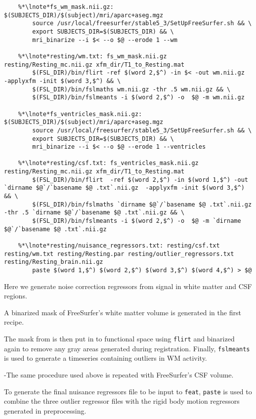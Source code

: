 \begin{lstlisting}
	%*\lnote*fs_wm_mask.nii.gz: $(SUBJECTS_DIR)/$(subject)/mri/aparc+aseg.mgz
		source /usr/local/freesurfer/stable5_3/SetUpFreeSurfer.sh && \
		export SUBJECTS_DIR=$(SUBJECTS_DIR) && \
		mri_binarize --i $< --o $@ --erode 1 --wm
	
	%*\lnote*resting/wm.txt: fs_wm_mask.nii.gz resting/Resting_mc.nii.gz xfm_dir/T1_to_Resting.mat
		$(FSL_DIR)/bin/flirt -ref $(word 2,$^) -in $< -out wm.nii.gz  -applyxfm -init $(word 3,$^) && \
		$(FSL_DIR)/bin/fslmaths wm.nii.gz -thr .5 wm.nii.gz && \
		$(FSL_DIR)/bin/fslmeants -i $(word 2,$^) -o  $@ -m wm.nii.gz
	
	%*\lnote*fs_ventricles_mask.nii.gz: $(SUBJECTS_DIR)/$(subject)/mri/aparc+aseg.mgz
		source /usr/local/freesurfer/stable5_3/SetUpFreeSurfer.sh && \
		export SUBJECTS_DIR=$(SUBJECTS_DIR) && \
		mri_binarize --i $< --o $@ --erode 1 --ventricles
	
	%*\lnote*resting/csf.txt: fs_ventricles_mask.nii.gz resting/Resting_mc.nii.gz xfm_dir/T1_to_Resting.mat
		$(FSL_DIR)/bin/flirt  -ref $(word 2,$^) -in $(word 1,$^) -out `dirname $@`/`basename $@ .txt`.nii.gz  -applyxfm -init $(word 3,$^) && \
		$(FSL_DIR)/bin/fslmaths `dirname $@`/`basename $@ .txt`.nii.gz -thr .5 `dirname $@`/`basename $@ .txt`.nii.gz && \
		$(FSL_DIR)/bin/fslmeants -i $(word 2,$^) -o  $@ -m `dirname $@`/`basename $@ .txt`.nii.gz
	
	%*\lnote*resting/nuisance_regressors.txt: resting/csf.txt resting/wm.txt resting/Resting.par resting/outlier_regressors.txt resting/Resting_brain.nii.gz
		paste $(word 1,$^) $(word 2,$^) $(word 3,$^) $(word 4,$^) > $@
\end{lstlisting}
Here we generate noise correction regressors from signal in white matter and CSF regions. 

\lnum{31}A binarized mask of FreeSurfer's white matter volume is generated in the first recipe. 

The mask from is then put in to functional space using \texttt{flirt} and binarized again to remove any gray areas generated during registration. Finally, \texttt{fslmeants} is used to generate a timeseries containing outliers in WM activity. 

\lnum{33}-\lnum{34}The same procedure used above is repeated with FreeSurfer's CSF volume.

\lnum{35}To generate the final nuisance regressors file to be input to \texttt{feat}, \texttt{paste} is used to combine the three outlier regressor files with the rigid body motion regressors generated in preprocessing.

